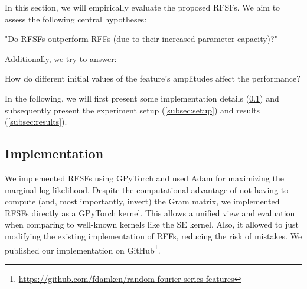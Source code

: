 In this section, we will empirically evaluate the proposed \acp{RFSF}.
We aim to assess the following central hypotheses:
\begin{hypothesis}
	"Do \acp{RFSF} outperform \acp{RFF} (due to their increased parameter capacity)?"
	\label{hyp:rfsfAreBetter}
\end{hypothesis}
Additionally, we try to answer:
\begin{hypothesis}
	How do different initial values of the feature's amplitudes affect the performance?
	\label{hyp:initialValues}
\end{hypothesis}
In the following, we will first present some implementation details (\cref{subsec:impl}) and subsequently present the experiment setup (\cref{subsec:setup}) and results (\cref{subsec:results}).


\subsection{Implementation}  \label{subsec:impl}
	We implemented \acp{RFSF} using GPyTorch\cite{jacotNeuralTangentKernel2020} and used Adam\cite{kingmaAdamMethodStochastic2017a} for maximizing the marginal log-likelihood.
	Despite the computational advantage of not having to compute (and, most importantly, invert) the Gram matrix, we implemented \acp{RFSF} directly as a GPyTorch kernel.
	This allows a unified view and evaluation when comparing to well-known kernels like the \ac{SE} kernel.
	Also, it allowed to just modifying the existing implementation of \acp{RFF}, reducing the risk of mistakes.
	We published our implementation on \href{https://github.com/fdamken/random-fourier-series-features}{GitHub}\footnote{\url{https://github.com/fdamken/random-fourier-series-features}}.


